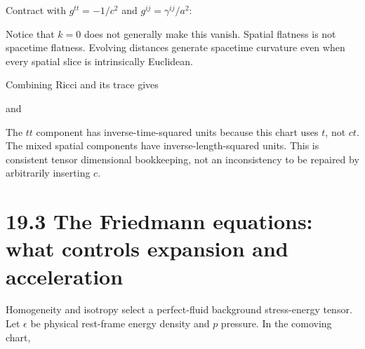 \documentclass[
  11pt,
  letterpaper,
  oneside,
  openany]{scrbook}
\begin{document}
Contract with \(g^{tt}=-1/c^2\) and \(g^{ij}=\gamma^{ij}/a^2\):

\begin{center}
\begingroup
{}
\ifdim\wd\grmathbox>\linewidth
\resizebox{\linewidth}{!}{\usebox{\grmathbox}}
\else\usebox{\grmathbox}\fi
\endgroup
\end{center}

Notice that \(k=0\) does not generally make this vanish. Spatial
flatness is not spacetime flatness. Evolving distances generate
spacetime curvature even when every spatial slice is intrinsically
Euclidean.

Combining Ricci and its trace gives

\begin{center}
\begingroup
{}
\ifdim\wd\grmathbox>\linewidth
\resizebox{\linewidth}{!}{\usebox{\grmathbox}}
\else\usebox{\grmathbox}\fi
\endgroup
\end{center}

and

\begin{center}
\begingroup
{}
\ifdim\wd\grmathbox>\linewidth
\resizebox{\linewidth}{!}{\usebox{\grmathbox}}
\else\usebox{\grmathbox}\fi
\endgroup
\end{center}

The \(tt\) component has inverse-time-squared units because this chart
uses \(t\), not \(ct\). The mixed spatial components have
inverse-length-squared units. This is consistent tensor dimensional
bookkeeping, not an inconsistency to be repaired by arbitrarily
inserting \(c\).

\hypertarget{the-friedmann-equations-what-controls-expansion-and-acceleration}{%
\section{19.3 The Friedmann equations: what controls expansion and
acceleration}\label{the-friedmann-equations-what-controls-expansion-and-acceleration}}

Homogeneity and isotropy select a perfect-fluid background stress-energy
tensor. Let \(\epsilon\) be physical rest-frame energy density and \(p\)
pressure. In the comoving chart,
\end{document}
